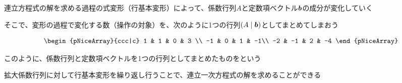 \documentclass[../../../topic_linear-algebra]{subfiles}
\begin{document}
\br

連立方程式の解を求める過程の式変形（行基本変形）によって、係数行列$A$と定数項ベクトル$\vb*{b}$の成分が変化していく

\br

そこで、変形の過程で変化する数（操作の対象）を、次のように1つの行列$(A \mid \vb*{b})$としてまとめてしまおう

\begin{equation*}
  \begin{pNiceArray}{ccc|c}
    1 & 1 & 0 & 3 \\
    -1 & 0 & 1 & -1\\
    -2 & -1 & 2 & -4
  \end{pNiceArray}
\end{equation*}

\br

このように、係数行列と定数項ベクトルを1つの行列としてまとめたものをという

\br

拡大係数行列に対して行基本変形を繰り返し行うことで、連立一次方程式の解を求めることができる
\end{document}
